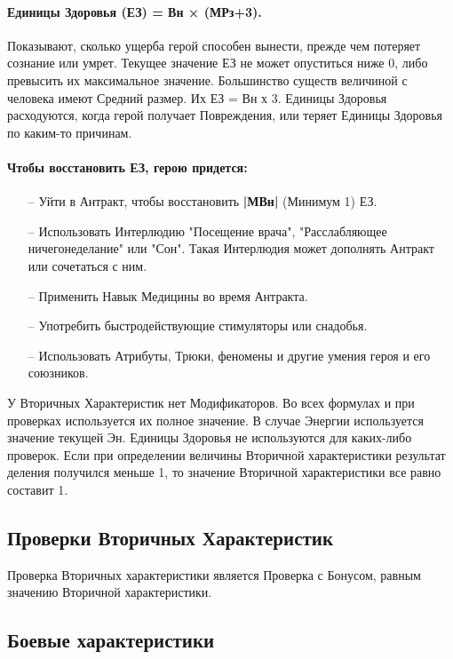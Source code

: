 \paragraph{Единицы Здоровья (ЕЗ) = Вн × (МРз+3).} Показывают, сколько ущерба герой способен вынести, прежде чем потеряет сознание или умрет. Текущее значение ЕЗ не может опуститься ниже 0, либо превысить их максимальное значение.
\newline Большинство существ величиной с человека имеют Средний размер. Их ЕЗ = Вн х 3.
\newline Единицы Здоровья расходуются, когда герой получает Повреждения, или теряет Единицы Здоровья по каким-то причинам. 
\paragraph{Чтобы восстановить ЕЗ, герою придется:}
\begin{itemize}
    \item[--] Уйти в Антракт, чтобы восстановить \textbf{|МВн|} (Минимум 1) ЕЗ.
    \item[--] Использовать Интерлюдию "Посещение врача", "Расслабляющее ничегонеделание" или "Сон". Такая Интерлюдия может дополнять Антракт или сочетаться с ним.
    \item[--] Применить Навык Медицины во время Антракта.
    \item[--] Употребить быстродействующие стимуляторы или снадобья.
    \item[--] Использовать Атрибуты, Трюки, феномены и другие умения героя и его союзников.
\end{itemize}

У Вторичных Характеристик нет Модификаторов. Во всех формулах и при проверках используется их полное значение. В случае Энергии используется значение текущей Эн. Единицы Здоровья не используются для каких-либо проверок.
\newline Если при определении величины Вторичной характеристики результат деления получился меньше 1, то значение Вторичной характеристики все равно составит 1. 

\subsection{Проверки Вторичных Характеристик}
Проверка Вторичных характеристики является Проверка с Бонусом, равным значению Вторичной характеристики.

\subsection{Боевые характеристики}
